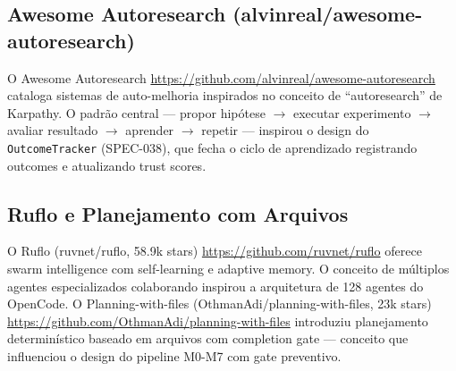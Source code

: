 \subsection{Awesome Autoresearch (alvinreal/awesome-autoresearch)}

O Awesome Autoresearch \url{https://github.com/alvinreal/awesome-autoresearch} cataloga sistemas de auto-melhoria inspirados no conceito de ``autoresearch'' de Karpathy. O padrão central — propor hipótese $\rightarrow$ executar experimento $\rightarrow$ avaliar resultado $\rightarrow$ aprender $\rightarrow$ repetir — inspirou o design do \texttt{OutcomeTracker} (SPEC-038), que fecha o ciclo de aprendizado registrando outcomes e atualizando trust scores.

\subsection{Ruflo e Planejamento com Arquivos}

O Ruflo (ruvnet/ruflo, 58.9k stars) \url{https://github.com/ruvnet/ruflo} oferece swarm intelligence com self-learning e adaptive memory. O conceito de múltiplos agentes especializados colaborando inspirou a arquitetura de 128 agentes do OpenCode. O Planning-with-files (OthmanAdi/planning-with-files, 23k stars) \url{https://github.com/OthmanAdi/planning-with-files} introduziu planejamento determinístico baseado em arquivos com completion gate — conceito que influenciou o design do pipeline M0-M7 com gate preventivo.
